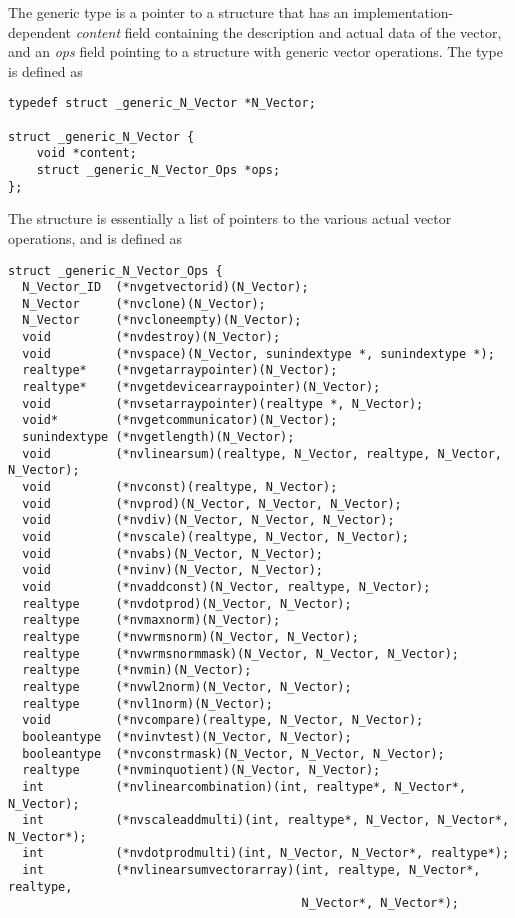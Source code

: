 The generic  type is a pointer to a structure that has an
implementation-dependent {\em content} field containing the
description and actual data of the vector, and an {\em ops} field
pointing to a structure with generic vector operations.
The type  is defined as
\begin{verbatim}
typedef struct _generic_N_Vector *N_Vector;

struct _generic_N_Vector {
    void *content;
    struct _generic_N_Vector_Ops *ops;
};
\end{verbatim}
The  structure is essentially a list of pointers to
the various actual vector operations, and is defined as
\begin{verbatim}
struct _generic_N_Vector_Ops {
  N_Vector_ID  (*nvgetvectorid)(N_Vector);
  N_Vector     (*nvclone)(N_Vector);
  N_Vector     (*nvcloneempty)(N_Vector);
  void         (*nvdestroy)(N_Vector);
  void         (*nvspace)(N_Vector, sunindextype *, sunindextype *);
  realtype*    (*nvgetarraypointer)(N_Vector);
  realtype*    (*nvgetdevicearraypointer)(N_Vector);
  void         (*nvsetarraypointer)(realtype *, N_Vector);
  void*        (*nvgetcommunicator)(N_Vector);
  sunindextype (*nvgetlength)(N_Vector);
  void         (*nvlinearsum)(realtype, N_Vector, realtype, N_Vector, N_Vector);
  void         (*nvconst)(realtype, N_Vector);
  void         (*nvprod)(N_Vector, N_Vector, N_Vector);
  void         (*nvdiv)(N_Vector, N_Vector, N_Vector);
  void         (*nvscale)(realtype, N_Vector, N_Vector);
  void         (*nvabs)(N_Vector, N_Vector);
  void         (*nvinv)(N_Vector, N_Vector);
  void         (*nvaddconst)(N_Vector, realtype, N_Vector);
  realtype     (*nvdotprod)(N_Vector, N_Vector);
  realtype     (*nvmaxnorm)(N_Vector);
  realtype     (*nvwrmsnorm)(N_Vector, N_Vector);
  realtype     (*nvwrmsnormmask)(N_Vector, N_Vector, N_Vector);
  realtype     (*nvmin)(N_Vector);
  realtype     (*nvwl2norm)(N_Vector, N_Vector);
  realtype     (*nvl1norm)(N_Vector);
  void         (*nvcompare)(realtype, N_Vector, N_Vector);
  booleantype  (*nvinvtest)(N_Vector, N_Vector);
  booleantype  (*nvconstrmask)(N_Vector, N_Vector, N_Vector);
  realtype     (*nvminquotient)(N_Vector, N_Vector);
  int          (*nvlinearcombination)(int, realtype*, N_Vector*, N_Vector);
  int          (*nvscaleaddmulti)(int, realtype*, N_Vector, N_Vector*, N_Vector*);
  int          (*nvdotprodmulti)(int, N_Vector, N_Vector*, realtype*);
  int          (*nvlinearsumvectorarray)(int, realtype, N_Vector*, realtype,
                                         N_Vector*, N_Vector*);

\end{verbatim}
